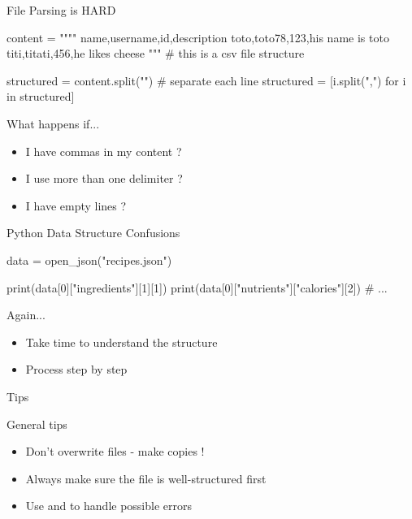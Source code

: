 \documentclass[serif, aspectratio=169]{beamer}
\begin{document}
\begin{frame}[fragile]{File Parsing is HARD}
    \begin{pythoncode}
    content = """"
    name,username,id,description
    toto,toto78,123,his name is toto
    titi,titati,456,he likes cheese
    """ # this is a csv file structure

    structured = content.split("\n") # separate each line
    structured = [i.split(",") for i in structured]
    \end{pythoncode}
    \vfill
    \begin{block}{What happens if...}
        \begin{itemize}
            \item I have commas in my content ?
            \item I use more than one delimiter ?
            \item I have empty lines ?
        \end{itemize}
    \end{block}
\end{frame}

\begin{frame}[fragile]{Python Data Structure Confusions}
    \begin{pythoncode}
    data = open_json("recipes.json")

    print(data[0]["ingredients"][1][1])
    print(data[0]["nutrients"]["calories"][2])
    # ...
    \end{pythoncode}
    \vfill
    \begin{block}{Again...}
        \begin{itemize}
            \item Take time to understand the structure
            \item Process step by step
        \end{itemize}
    \end{block}
\end{frame}

\begin{frame}{Tips}
    \begin{block}{General tips}
        \begin{itemize}
            \item Don't overwrite files - make copies !
            \item Always make sure the file is well-structured first
            \item Use  and  to handle possible errors
        \end{itemize}
    \end{block}
\end{frame}
\end{document}
